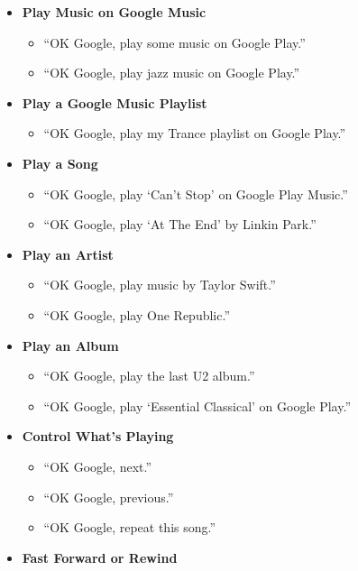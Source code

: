 \documentclass[
  jou,
  floatsintext,
  longtable,
  a4paper,
  nolmodern,
  notxfonts,
  notimes,
  12pt,
  colorlinks=true,linkcolor=blue,citecolor=blue,urlcolor=blue]{apa7}
\providecommand{\tightlist}{%
  \setlength{\itemsep}{0pt}\setlength{\parskip}{0pt}}
\begin{document}
\begin{itemize}
\tightlist
\item
  \textbf{Play Music on Google Music}

  \begin{itemize}
  \tightlist
  \item
    ``OK Google, play some music on Google Play.''
  \item
    ``OK Google, play jazz music on Google Play.''
  \end{itemize}
\item
  \textbf{Play a Google Music Playlist}

  \begin{itemize}
  \tightlist
  \item
    ``OK Google, play my Trance playlist on Google Play.''
  \end{itemize}
\item
  \textbf{Play a Song}

  \begin{itemize}
  \tightlist
  \item
    ``OK Google, play `Can't Stop' on Google Play Music.''
  \item
    ``OK Google, play `At The End' by Linkin Park.''
  \end{itemize}
\item
  \textbf{Play an Artist}

  \begin{itemize}
  \tightlist
  \item
    ``OK Google, play music by Taylor Swift.''
  \item
    ``OK Google, play One Republic.''
  \end{itemize}
\item
  \textbf{Play an Album}

  \begin{itemize}
  \tightlist
  \item
    ``OK Google, play the last U2 album.''
  \item
    ``OK Google, play `Essential Classical' on Google Play.''
  \end{itemize}
\item
  \textbf{Control What's Playing}

  \begin{itemize}
  \tightlist
  \item
    ``OK Google, next.''
  \item
    ``OK Google, previous.''
  \item
    ``OK Google, repeat this song.''
  \end{itemize}
\item
  \textbf{Fast Forward or Rewind}


\end{itemize}
\end{document}
